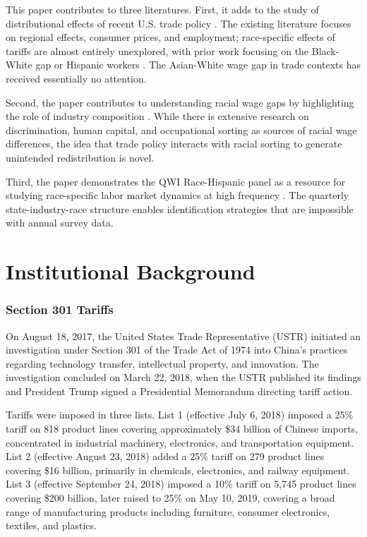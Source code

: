\documentclass[12pt]{article}
\begin{document}
This paper contributes to three literatures. First, it adds to the study of distributional effects of recent U.S. trade policy \citep{fajgelbaum2020return,amiti2019impact,autor2021trading,handley2020rising}. The existing literature focuses on regional effects, consumer prices, and employment; race-specific effects of tariffs are almost entirely unexplored, with prior work focusing on the Black-White gap or Hispanic workers \citep{autor2013china,dix2020trade}. The Asian-White wage gap in trade contexts has received essentially no attention.

Second, the paper contributes to understanding racial wage gaps by highlighting the role of industry composition \citep{altonji1999race,lang2020race}. While there is extensive research on discrimination, human capital, and occupational sorting as sources of racial wage differences, the idea that trade policy interacts with racial sorting to generate unintended redistribution is novel.

Third, the paper demonstrates the QWI Race-Hispanic panel as a resource for studying race-specific labor market dynamics at high frequency \citep{abowd2009lehd}. The quarterly state-industry-race structure enables identification strategies that are impossible with annual survey data.

\section{Institutional Background}

\subsubsection*{Section 301 Tariffs} On August 18, 2017, the United States Trade Representative (USTR) initiated an investigation under Section 301 of the Trade Act of 1974 into China's practices regarding technology transfer, intellectual property, and innovation. The investigation concluded on March 22, 2018, when the USTR published its findings and President Trump signed a Presidential Memorandum directing tariff action.

Tariffs were imposed in three lists. List 1 (effective July 6, 2018) imposed a 25\% tariff on 818 product lines covering approximately \$34 billion of Chinese imports, concentrated in industrial machinery, electronics, and transportation equipment. List 2 (effective August 23, 2018) added a 25\% tariff on 279 product lines covering \$16 billion, primarily in chemicals, electronics, and railway equipment. List 3 (effective September 24, 2018) imposed a 10\% tariff on 5,745 product lines covering \$200 billion, later raised to 25\% on May 10, 2019, covering a broad range of manufacturing products including furniture, consumer electronics, textiles, and plastics.
\end{document}
